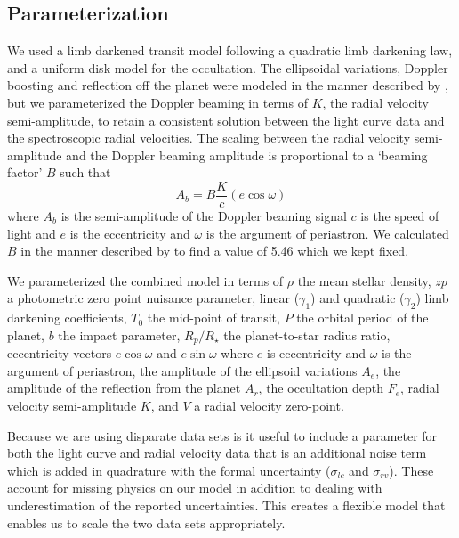 \documentclass[apjl]{emulateapj}
\begin{document}
\subsection{Parameterization}
We used a limb darkened transit model \citep{mandel02} following a quadratic limb darkening law, and a uniform disk model for the occultation. The ellipsoidal variations, Doppler boosting and reflection off the planet were modeled in the manner described by \citet{lillo14}, but we parameterized the Doppler beaming in terms of $K$, the radial velocity semi-amplitude, to retain a consistent solution between the light curve data and the spectroscopic radial velocities. The scaling between the radial velocity semi-amplitude and the Doppler beaming amplitude is proportional to a `beaming factor' $B$ such that
\begin{equation}
A_b = B \frac{K}{c} (e\cos{\omega})
\end{equation}
where $A_b$ is the semi-amplitude of the Doppler beaming signal $c$ is the speed of light and $e$ is the eccentricity and $\omega$ is the argument of periastron. We calculated $B$ in the manner described by \citet{bloemen11} to find a value of 5.46 which we kept fixed.

We parameterized the combined model in terms of $\rho$ the mean stellar density, $zp$ a photometric zero point nuisance parameter, linear ($\gamma_1$) and quadratic ($\gamma_2$) limb darkening coefficients, $T_0$ the mid-point of transit, $P$ the orbital period of the planet, $b$ the impact parameter, $R_{p}/R_{\star}$ the planet-to-star radius ratio, eccentricity vectors $e\cos{\omega}$ and $e\sin{\omega}$ where $e$ is eccentricity and $\omega$ is the argument of periastron, the amplitude of the ellipsoid variations $A_e$, the amplitude of the reflection from the planet $A_r$, the occultation depth $F_e$, radial velocity semi-amplitude $K$, and $V$ a radial velocity zero-point.

Because we are using disparate data sets is it useful to include a parameter for both the light curve and radial velocity data that is an additional noise term which is added in quadrature with the formal uncertainty ($\sigma_{lc}$ and $\sigma_{rv}$). These account for missing physics on our model in addition to dealing with underestimation of the reported uncertainties. This creates a flexible model that enables us to scale the two data sets appropriately.

\end{document}
